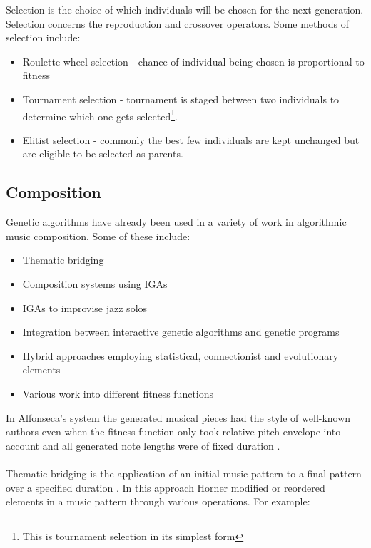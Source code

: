 Selection is the choice of which individuals will be chosen for the next generation. Selection concerns the reproduction and crossover operators. Some methods of selection include: 
\begin{itemize}
\item Roulette wheel selection - chance of individual being chosen is proportional to fitness
\item Tournament selection - tournament is staged between two individuals to determine which one gets selected\footnote{This is tournament selection in its simplest form}.
\item Elitist selection - commonly the best few individuals are kept unchanged but are eligible to be selected as parents.
\end{itemize}

\subsection{Composition}

Genetic algorithms have already been used in a variety of work in algorithmic music composition. Some of these include:
\begin{itemize}
\item Thematic bridging \cite{Horner1991}
\item Composition systems using \acsp{IGA} \cite{1412045}
\item \acsp{IGA} to improvise jazz solos \cite{Biles1996, Biles1994}
\item Integration between interactive genetic algorithms and genetic programs \cite{Tokui2000}
\item Hybrid approaches employing statistical, connectionist and evolutionary elements \cite{Manaris2007}
\item Various work into different fitness functions
\end{itemize}

In Alfonseca's system the generated musical pieces had the style of well-known authors even when the fitness function only took relative pitch envelope into account and all generated note lengths were of fixed duration \cite{Alfonseca2007}.
\\
\\
Thematic bridging is the application of an initial music pattern to a final pattern over a specified duration \cite{Horner1991}. In this approach Horner modified or reordered elements in a music pattern through various operations. For example:

